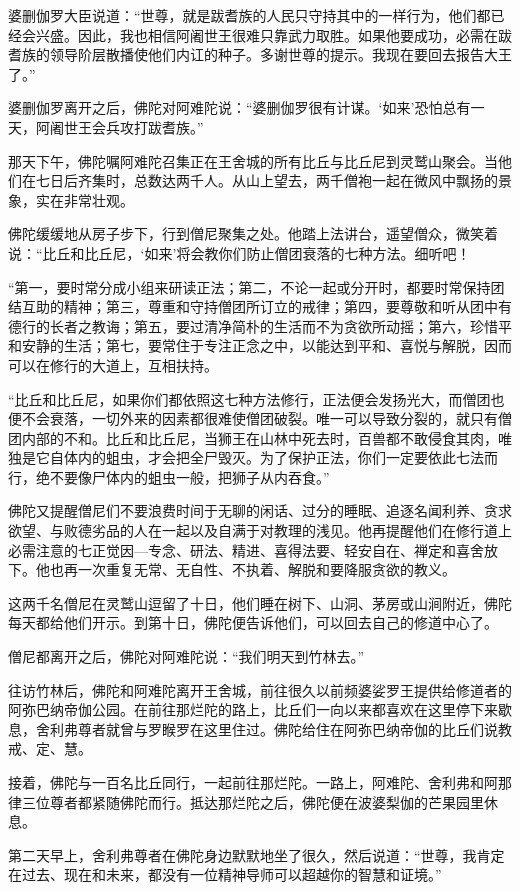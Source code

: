 \documentclass[12pt,twoside,openany]{book}
\begin{document}
婆删伽罗大臣说道：“世尊，就是跋耆族的人民只守持其中的一样行为，他们都已经会兴盛。因此，我也相信阿阇世王很难只靠武力取胜。如果他要成功，必需在跋耆族的领导阶层散播使他们内讧的种子。多谢世尊的提示。我现在要回去报告大王了。”

婆删伽罗离开之后，佛陀对阿难陀说：“婆删伽罗很有计谋。‘如来’恐怕总有一天，阿阇世王会兵攻打跋耆族。”

那天下午，佛陀嘱阿难陀召集正在王舍城的所有比丘与比丘尼到灵鹫山聚会。当他们在七日后齐集时，总数达两千人。从山上望去，两千僧袍一起在微风中飘扬的景象，实在非常壮观。

佛陀缓缓地从房子步下，行到僧尼聚集之处。他踏上法讲台，遥望僧众，微笑着说：“比丘和比丘尼，‘如来’将会教你们防止僧团衰落的七种方法。细听吧！

“第一，要时常分成小组来研读正法；第二，不论一起或分开时，都要时常保持团结互助的精神；第三，尊重和守持僧团所订立的戒律；第四，要尊敬和听从团中有德行的长者之教诲；第五，要过清净简朴的生活而不为贪欲所动摇；第六，珍惜平和安静的生活；第七，要常住于专注正念之中，以能达到平和、喜悦与解脱，因而可以在修行的大道上，互相扶持。

“比丘和比丘尼，如果你们都依照这七种方法修行，正法便会发扬光大，而僧团也便不会衰落，一切外来的因素都很难使僧团破裂。唯一可以导致分裂的，就只有僧团内部的不和。比丘和比丘尼，当狮王在山林中死去时，百兽都不敢侵食其肉，唯独是它自体内的蛆虫，才会把全尸毁灭。为了保护正法，你们一定要依此七法而行，绝不要像尸体内的蛆虫一般，把狮子从内吞食。”

佛陀又提醒僧尼们不要浪费时间于无聊的闲话、过分的睡眠、追逐名闻利养、贪求欲望、与败德劣品的人在一起以及自满于对教理的浅见。他再提醒他们在修行道上必需注意的七正觉因---专念、研法、精进、喜得法要、轻安自在、禅定和喜舍放下。他也再一次重复无常、无自性、不执着、解脱和要降服贪欲的教义。

这两千名僧尼在灵鹫山逗留了十日，他们睡在树下、山洞、茅房或山涧附近，佛陀每天都给他们开示。到第十日，佛陀便告诉他们，可以回去自己的修道中心了。

僧尼都离开之后，佛陀对阿难陀说：“我们明天到竹林去。”

往访竹林后，佛陀和阿难陀离开王舍城，前往很久以前频婆娑罗王提供给修道者的阿弥巴纳帝伽公园。在前往那烂陀的路上，比丘们一向以来都喜欢在这里停下来歇息，舍利弗尊者就曾与罗睺罗在这里住过。佛陀给住在阿弥巴纳帝伽的比丘们说教戒、定、慧。

接着，佛陀与一百名比丘同行，一起前往那烂陀。一路上，阿难陀、舍利弗和阿那律三位尊者都紧随佛陀而行。抵达那烂陀之后，佛陀便在波婆梨伽的芒果园里休息。

第二天早上，舍利弗尊者在佛陀身边默默地坐了很久，然后说道：“世尊，我肯定在过去、现在和未来，都没有一位精神导师可以超越你的智慧和证境。”
\end{document}
